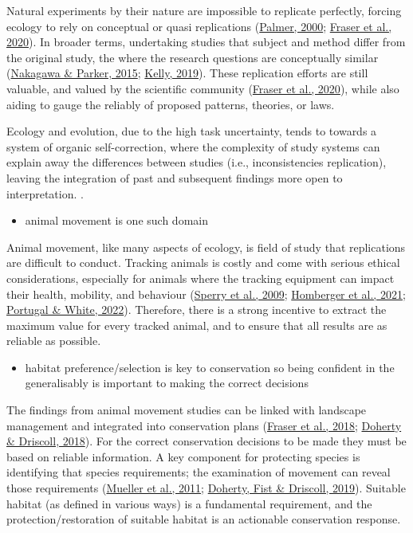 \documentclass[10pt,a4paper]{article}
\providecommand{\tightlist}{%
  \setlength{\itemsep}{0pt}\setlength{\parskip}{0pt}}
\begin{document}
Natural experiments by their nature are impossible to replicate perfectly, forcing ecology to rely on conceptual or quasi replications (\protect\hyperlink{ref-palmer_quasi-replication_2000}{Palmer, 2000}; \protect\hyperlink{ref-fraser_role_2020}{Fraser et al., 2020}).
In broader terms, undertaking studies that subject and method differ from the original study, the where the research questions are conceptually similar (\protect\hyperlink{ref-nakagawa_replicating_2015}{Nakagawa \& Parker, 2015}; \protect\hyperlink{ref-kelly_rate_2019}{Kelly, 2019}).
These replication efforts are still valuable, and valued by the scientific community (\protect\hyperlink{ref-fraser_role_2020}{Fraser et al., 2020}), while also aiding to gauge the reliably of proposed patterns, theories, or laws.

Ecology and evolution, due to the high task uncertainty, tends to towards a system of organic self-correction, where the complexity of study systems can explain away the differences between studies (i.e., inconsistencies replication), leaving the integration of past and subsequent findings more open to interpretation. .

\begin{itemize}
\tightlist
\item
  animal movement is one such domain
\end{itemize}

Animal movement, like many aspects of ecology, is field of study that replications are difficult to conduct.
Tracking animals is costly and come with serious ethical considerations, especially for animals where the tracking equipment can impact their health, mobility, and behaviour (\protect\hyperlink{ref-Sperry2009}{Sperry et al., 2009}; \protect\hyperlink{ref-homberger_strong_2021}{Homberger et al., 2021}; \protect\hyperlink{ref-portugal_externally_2022}{Portugal \& White, 2022}).
Therefore, there is a strong incentive to extract the maximum value for every tracked animal, and to ensure that all results are as reliable as possible.

\begin{itemize}
\tightlist
\item
  habitat preference/selection is key to conservation so being confident in the generalisably is important to making the correct decisions
\end{itemize}

The findings from animal movement studies can be linked with landscape management and integrated into conservation plans (\protect\hyperlink{ref-Fraser2018}{Fraser et al., 2018}; \protect\hyperlink{ref-doherty_coupling_2018}{Doherty \& Driscoll, 2018}).
For the correct conservation decisions to be made they must be based on reliable information.
A key component for protecting species is identifying that species requirements; the examination of movement can reveal those requirements (\protect\hyperlink{ref-mueller_how_2011}{Mueller et al., 2011}; \protect\hyperlink{ref-doherty_animal_2019}{Doherty, Fist \& Driscoll, 2019}).
Suitable habitat (as defined in various ways) is a fundamental requirement, and the protection/restoration of suitable habitat is an actionable conservation response.
\end{document}
